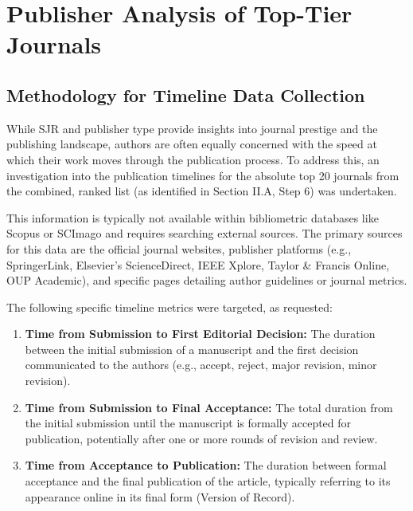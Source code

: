 \documentclass[../main.tex]{subfiles}
\begin{document}
\section{Publisher Analysis of Top-Tier Journals}

\subsection{Methodology for Timeline Data Collection}

\vspace{0.2cm}
\noindent
While SJR and publisher type provide insights into journal prestige and the publishing landscape, authors are often equally concerned with the speed at which their work moves through the publication process. To address this, an investigation into the publication timelines for the absolute top 20 journals from the combined, ranked list (as identified in Section II.A, Step 6) was undertaken.

\vspace{0.2cm}
\noindent
This information is typically not available within bibliometric databases like Scopus or SCImago and requires searching external sources. The primary sources for this data are the official journal websites, publisher platforms (e.g., SpringerLink, Elsevier's ScienceDirect, IEEE Xplore, Taylor \& Francis Online, OUP Academic), and specific pages detailing author guidelines or journal metrics.

\vspace{0.2cm}
\noindent
The following specific timeline metrics were targeted, as requested:

\begin{enumerate}
    \item \textbf{Time from Submission to First Editorial Decision:} The duration between the initial submission of a manuscript and the first decision communicated to the authors (e.g., accept, reject, major revision, minor revision).
    \item \textbf{Time from Submission to Final Acceptance:} The total duration from the initial submission until the manuscript is formally accepted for publication, potentially after one or more rounds of revision and review.
    \item \textbf{Time from Acceptance to Publication:} The duration between formal acceptance and the final publication of the article, typically referring to its appearance online in its final form (Version of Record).
\end{enumerate}
\end{document}
